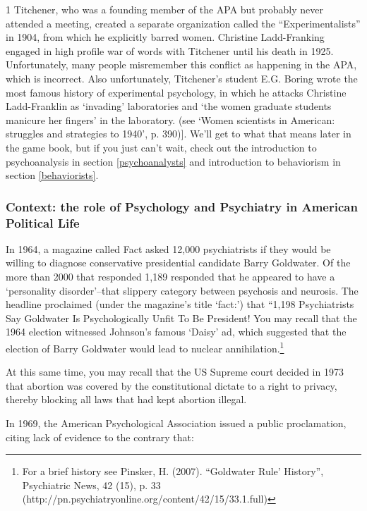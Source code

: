 1 Titchener, who was a founding member of the APA but probably never attended a meeting, created a separate organization called the “Experimentalists” in 1904, from which he explicitly barred women. Christine Ladd-Franking engaged in high profile war of words with Titchener until his death in 1925. Unfortunately, many people misremember this conflict as happening in the APA, which is incorrect. Also unfortunately, Titchener's student E.G. Boring wrote the most famous history of experimental psychology, in which he attacks Christine Ladd-Franklin as `invading' laboratories and `the women graduate students manicure her fingers' in the laboratory. (see `Women scientists in American: struggles and strategies to 1940', p. 390)]. We’ll get to what that means later in the game book, but if you just can’t wait, check out the introduction to psychoanalysis in section \ref{psychoanalysts} and introduction to behaviorism in section \ref{behaviorists}.

\subsubsection{Context: the role of Psychology and Psychiatry in American Political Life}
\label{context:theroleofpsychologyandpsychiatryinamericanpoliticallife}

In 1964, a magazine called Fact asked 12,000 psychiatrists if they would be willing to diagnose conservative presidential candidate Barry Goldwater. Of the more than 2000 that responded 1,189 responded that he appeared to have a `personality disorder'--that slippery category between psychosis and neurosis. The headline proclaimed (under the magazine's title `fact:') that “1,198 Psychiatrists Say Goldwater Is Psychologically Unfit To Be President! You may recall that the 1964 election witnessed Johnson's famous `Daisy' ad, which suggested that the election of Barry Goldwater would lead to nuclear annihilation.\footnote{For a brief history see Pinsker, H. (2007). “Goldwater Rule' History”, Psychiatric News, 42 (15), p. 33 (http:\slash \slash pn.psychiatryonline.org\slash content\slash 42\slash 15\slash 33.1.full)} 

At this same time, you may recall that the US Supreme court decided in 1973 that abortion was covered by the constitutional dictate to a right to privacy, thereby blocking all laws that had kept abortion illegal.

In 1969, the American Psychological Association issued a public proclamation, citing lack of evidence to the contrary that:


